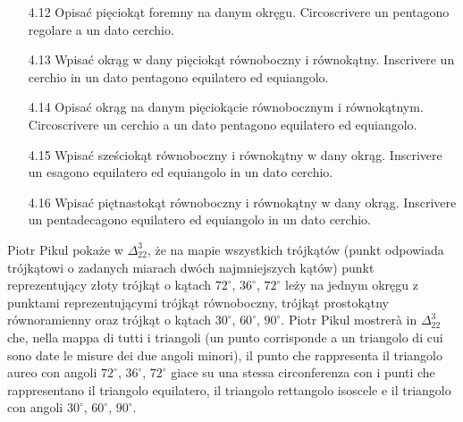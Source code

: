 \begin{enumerate}
	Inscrivere un pentagono regolare\footnote{Euclide parla qui di un pentagono al tempo stesso equilatero ed equiangolo.} in un dato cerchio. %
	\item [4.12]
	Opisać pięciokąt foremny na danym okręgu. %
	Circoscrivere un pentagono regolare a un dato cerchio. %
	\item [4.13]
	Wpisać okrąg w dany pięciokąt równoboczny i równokątny. %
	Inscrivere un cerchio in un dato pentagono equilatero ed equiangolo. %
	\item [4.14]
	Opisać okrąg na danym pięciokącie równobocznym i równokątnym. %
	Circoscrivere un cerchio a un dato pentagono equilatero ed equiangolo. %
	\item [4.15]
	Wpisać sześciokąt równoboczny i równokątny w dany okrąg. %
	Inscrivere un esagono equilatero ed equiangolo in un dato cerchio. %
	\item [4.16]
	Wpisać piętnastokąt równoboczny i równokątny w dany okrąg. %
	Inscrivere un pentadecagono equilatero ed equiangolo in un dato cerchio. %
\end{enumerate}

Piotr Pikul pokaże w $\Delta_{22}^{3}$, że na mapie wszystkich trójkątów (punkt odpowiada trójkątowi o zadanych miarach dwóch najmniejszych kątów) punkt reprezentujący złoty trójkąt o kątach $72^\circ$, $36^\circ$, $72^\circ$ leży na jednym okręgu z punktami reprezentującymi trójkąt równoboczny, trójkąt prostokątny równoramienny oraz trójkąt o kątach $30^\circ$, $60^\circ$, $90^\circ$. %
Piotr Pikul mostrerà in $\Delta_{22}^{3}$ che, nella mappa di tutti i triangoli (un punto corrisponde a un triangolo di cui sono date le misure dei due angoli minori), il punto che rappresenta il triangolo aureo con angoli $72^\circ$, $36^\circ$, $72^\circ$ giace su una stessa circonferenza con i punti che rappresentano il triangolo equilatero, il triangolo rettangolo isoscele e il triangolo con angoli $30^\circ$, $60^\circ$, $90^\circ$. %

%